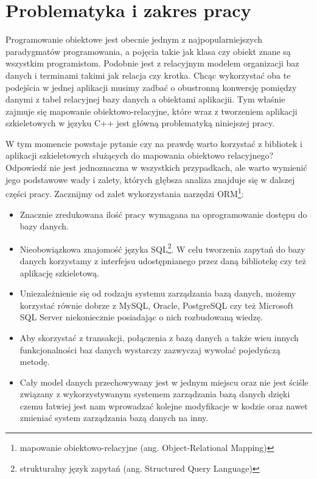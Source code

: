 \documentclass[12pt]{report}
\begin{document}
\section{Problematyka i zakres pracy}

Programowanie obiektowe jest obecnie jednym z najpopularniejszych paradygmatów programowania, a pojęcia takie jak klasa czy obiekt znane są wszystkim programistom.
Podobnie jest z relacyjnym modelem organizacji baz danych i terminami takimi jak relacja czy krotka. Chcąc wykorzystać oba te podejścia w jednej aplikacji musimy zadbać o 
obustronną konwersję pomiędzy danymi z tabel relacyjnej bazy danych a obiektami aplikacjii. Tym właśnie zajmuje się mapowanie obiektowo-relacyjne, które wraz z tworzeniem 
aplikacji szkieletowych w języku C++ jest główną problematyką niniejszej pracy.

W tym momencie powstaje pytanie czy na prawdę warto korzystać z bibliotek i aplikacji szkieletowych służących do mapowania obiektowo relacyjnego? Odpowiedź nie jest
jednoznaczna w wszystkich przypadkach, ale warto wymienić jego podstawowe wady i zalety, których głębsza analiza znajduje się w dalszej części pracy. Zacznijmy od zalet 
wykorzystania narzędzi ORM\footnote{mapowanie obiektowo-relacyjne (ang. Object-Relational Mapping)}:

\begin{itemize}
\item Znacznie zredukowana ilość pracy wymagana na oprogramowanie dostępu do bazy danych.
\item Nieobowiązkowa znajomość języka SQL\footnote{strukturalny język zapytań (ang. Structured Query Language)}. W celu tworzenia zapytań do bazy
danych korzystamy z interfejsu udostępnianego przez daną bibliotekę czy też aplikację szkieletową.
\item Uniezależnienie się od rodzaju systemu zarządzania bazą danych, możemy korzystać równie dobrze z MySQL, Oracle, PostgreSQL czy też Microsoft SQL Server
niekoniecznie posiadając o nich rozbudowaną wiedzę.
\item Aby skorzystać z transakcji, połączenia z bazą danych a także wieu innych funkcjonalności baz danych wystarczy zazwyczaj wywołać pojedyńczą metodę.
\item Cały model danych przechowywany jest w jednym miejscu oraz nie jest ściśle związany z wykorzystywanym systemem zarządzania bazą danych dzięki czemu łatwiej 
jest nam wprowadzać kolejne modyfikacje w kodzie oraz nawet zmieniać system zarządzania bazą danych na inny.
\end{itemize}
\end{document}
